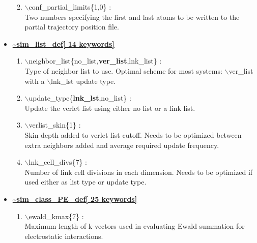 \begin{itemize}
\begin{enumerate}
 \vspace{0.15in} \Large
 \item   $\backslash$conf\_partial\_limits\{1,0\} : \\
   \large
   Two numbers specifying the first and last atoms to be written to
   the partial trajectory position file.

\end{enumerate}

\clearpage
\huge
\item[] \underline{\bf \~{}sim\_list\_def[ 14 keywords]}
\begin{enumerate}

 \vspace{0.15in} \Large
 \item   $\backslash$neighbor\_list\{no\_list,{\bf ver\_list},lnk\_list\} : \\
   \large
   Type of neighbor list to use.  Optimal scheme for most systems: 
   $\backslash$ver\_list with a $\backslash$lnk\_lst update type.

 \vspace{0.15in} \Large
 \item   $\backslash$update\_type\{{\bf lnk\_lst},no\_list\} : \\
   \large
   Update the verlet list using either no list or a link list.

 \vspace{0.15in} \Large
 \item   $\backslash$verlist\_skin\{1\} : \\
   \large
   Skin depth added to verlet list cutoff.  Needs to be optimized between
   extra neighbors added and average required update frequency.

 \vspace{0.15in} \Large
 \item   $\backslash$lnk\_cell\_divs\{7\} : \\
  \large
   Number of link cell divisions in each dimension.  Needs to be optimized
   if used either as list type or update type.

\end{enumerate}

\clearpage
\huge
\item[] \underline{\bf \~{}sim\_class\_PE\_def[ 25 keywords]}
\begin{enumerate}

 \vspace{0.15in} \Large
 \item   $\backslash$ewald\_kmax\{7\} : \\
  \large
  Maximum length of k-vectors used in evaluating Ewald summation for 
  electrostatic interactions.


\end{enumerate}
\end{itemize}
